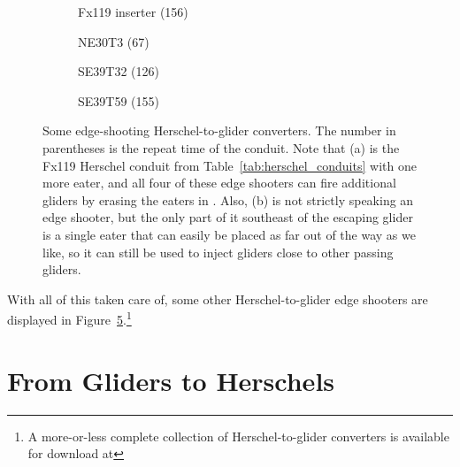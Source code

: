 \begin{figure}[!htb]
	\centering
	\begin{subfigure}{.205\textwidth}
		\centering
		\caption{Fx119 inserter (156)}
		\label{fig:herschel_to_glider_edge_3}
	\end{subfigure} \hfill %
	\begin{subfigure}{.245\textwidth}
		\centering\vspace*{0.9cm}
		\caption{NE30T3 (67)}
		\label{fig:herschel_to_glider_edge_4}
	\end{subfigure} \hfill %
	\begin{subfigure}{.245\textwidth}
		\centering\vspace*{1.2cm}
		\caption{SE39T32 (126)}
		\label{fig:herschel_to_glider_edge_1}
	\end{subfigure} \hfill %
	\begin{subfigure}{.235\textwidth}
		\centering
		\caption{SE39T59 (155)}
		\label{fig:herschel_to_glider_edge_2}
	\end{subfigure}
	\caption{Some edge-shooting Herschel-to-glider converters. The number in parentheses is the repeat time of the conduit. Note that (a) is the Fx119 Herschel conduit from Table~\ref{tab:herschel_conduits} with one more eater, and all four of these edge shooters can fire additional gliders by erasing the eaters in . Also, (b) is not strictly speaking an edge shooter, but the only part of it southeast of the escaping glider is a single eater that can easily be placed as far out of the way as we like, so it can still be used to inject gliders close to other passing gliders.}\label{fig:herschel_to_glider_edge}
\end{figure}

With all of this taken care of, some other Herschel-to-glider edge shooters are displayed in Figure~\ref{fig:herschel_to_glider_edge}.\footnote{A more-or-less complete collection of Herschel-to-glider converters is available for download at }


\section{From Gliders to Herschels}\label{sec:g_to_h}

